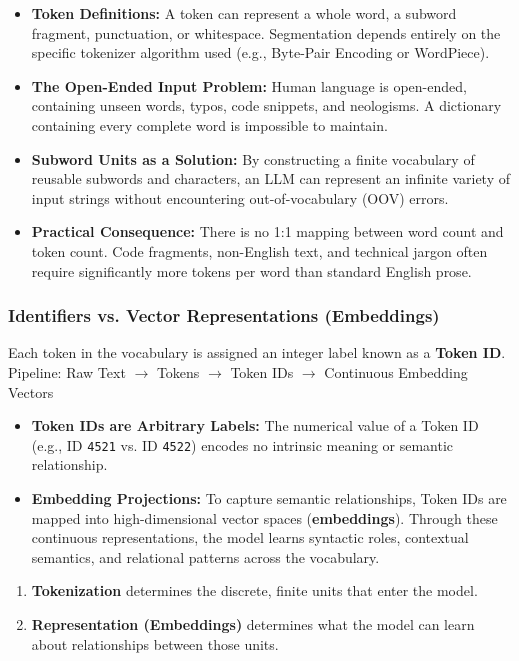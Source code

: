 \begin{itemize}
    \item \textbf{Token Definitions:} A token can represent a whole word, a subword fragment, punctuation, or whitespace. Segmentation depends entirely on the specific tokenizer algorithm used (e.g., Byte-Pair Encoding or WordPiece).
    \item \textbf{The Open-Ended Input Problem:} Human language is open-ended, containing unseen words, typos, code snippets, and neologisms. A dictionary containing every complete word is impossible to maintain.
    \item \textbf{Subword Units as a Solution:} By constructing a finite vocabulary of reusable subwords and characters, an LLM can represent an infinite variety of input strings without encountering out-of-vocabulary (OOV) errors.
    \item \textbf{Practical Consequence:} There is no 1:1 mapping between word count and token count. Code fragments, non-English text, and technical jargon often require significantly more tokens per word than standard English prose.
\end{itemize}

\subsubsection{Identifiers vs. Vector Representations (Embeddings)}

Each token in the vocabulary is assigned an integer label known as a \textbf{Token ID}.\\

\noindent
Pipeline: Raw Text $\longrightarrow$ Tokens $\longrightarrow$ Token IDs $\longrightarrow$ Continuous Embedding Vectors

\begin{itemize}
    \item \textbf{Token IDs are Arbitrary Labels:} The numerical value of a Token ID (e.g., ID \texttt{4521} vs. ID \texttt{4522}) encodes no intrinsic meaning or semantic relationship.
    \item \textbf{Embedding Projections:} To capture semantic relationships, Token IDs are mapped into high-dimensional vector spaces (\textbf{embeddings}). Through these continuous representations, the model learns syntactic roles, contextual semantics, and relational patterns across the vocabulary.
\end{itemize}

\begin{tcolorbox}[title=Core Architectural Takeaways]
\begin{enumerate}
    \item \textbf{Tokenization} determines the discrete, finite units that enter the model.
    \item \textbf{Representation (Embeddings)} determines what the model can learn about relationships between those units.
\end{enumerate}
\end{tcolorbox}

